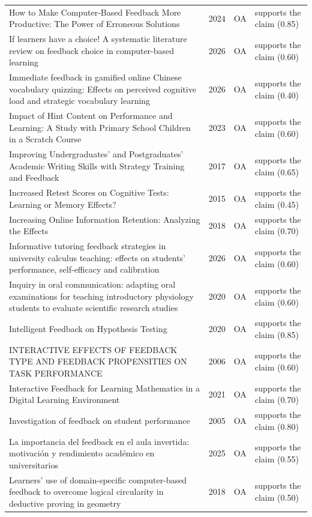 \begin{longtable}{@{}%
  >{\raggedright\arraybackslash}p{}c%
  >{\raggedright\arraybackslash}p{}%
  >{\raggedright\arraybackslash}p{}@{}}
How to Make Computer-Based Feedback More Productive: The Power of Erroneous Solutions & 2024 & OA & supports the claim (0.85) \\
If learners have a choice! A systematic literature review on feedback choice in computer-based learning & 2026 & OA & supports the claim (0.60) \\
Immediate feedback in gamified online Chinese vocabulary quizzing: Effects on perceived cognitive load and strategic vocabulary learning & 2026 & OA & supports the claim (0.40) \\
Impact of Hint Content on Performance and Learning: A Study with Primary School Children in a Scratch Course & 2023 & OA & supports the claim (0.60) \\
Improving Undergraduates' and Postgraduates' Academic Writing Skills with Strategy Training and Feedback & 2017 & OA & supports the claim (0.65) \\
Increased Retest Scores on Cognitive Tests: Learning or Memory Effects? & 2015 & OA & supports the claim (0.45) \\
Increasing Online Information Retention: Analyzing the Effects & 2018 & OA & supports the claim (0.70) \\
Informative tutoring feedback strategies in university calculus teaching: effects on students' performance, self-efficacy and calibration & 2026 & OA & supports the claim (0.60) \\
Inquiry in oral communication: adapting oral examinations for teaching introductory physiology students to evaluate scientific research studies & 2020 & OA & supports the claim (0.60) \\
Intelligent Feedback on Hypothesis Testing & 2020 & OA & supports the claim (0.85) \\
INTERACTIVE EFFECTS OF FEEDBACK TYPE AND FEEDBACK PROPENSITIES ON TASK PERFORMANCE & 2006 & OA & supports the claim (0.60) \\
Interactive Feedback for Learning Mathematics in a Digital Learning Environment & 2021 & OA & supports the claim (0.70) \\
Investigation of feedback on student performance & 2005 & OA & supports the claim (0.80) \\
La importancia del feedback en el aula invertida: motivación y rendimiento académico en universitarios & 2025 & OA & supports the claim (0.55) \\
Learners' use of domain-specific computer-based feedback to overcome logical circularity in deductive proving in geometry & 2018 & OA & supports the claim (0.50) \\

\end{longtable}
